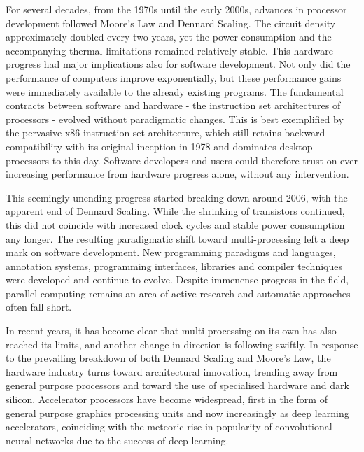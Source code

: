     For several decades, from the 1970s until the early 2000s, advances in
    processor development followed Moore's Law and Dennard Scaling.
    The circuit density approximately doubled every two years, yet the power
    consumption and the accompanying thermal limitations remained relatively
    stable.
    This hardware progress had major implications also for software
    development.
    Not only did the performance of computers improve exponentially, but these
    performance gains were immediately available to the already existing
    programs.
    The fundamental contracts between software and hardware - the
    instruction set architectures of processors - evolved without paradigmatic
    changes.
    This is best exemplified by the pervasive x86 instruction set architecture,
    which still retains backward compatibility with its original inception in
    1978 and dominates desktop processors to this day.
    Software developers and users could therefore trust on ever increasing
    performance from hardware progress alone, without any intervention.

    This seemingly unending progress started breaking down around 2006,
    with the apparent end of Dennard Scaling.
    While the shrinking of transistors continued, this did not coincide with
    increased clock cycles and stable power consumption any longer.
    The resulting paradigmatic shift toward multi-processing left a deep mark on
    software development.
    New programming paradigms and languages, annotation systems, programming
    interfaces, libraries and compiler techniques were developed and continue to
    evolve.
    Despite immenense progress in the field, parallel computing remains an area
    of active research and automatic approaches often fall short.

    In recent years, it has become clear that multi-processing on its own has
    also reached its limits, and another change in direction is following
    swiftly.
    In response to the prevailing breakdown of both Dennard Scaling and Moore's
    Law, the hardware industry turns toward architectural innovation, trending
    away from general purpose processors and toward the use of specialised
    hardware and dark silicon.
    Accelerator processors have become widespread, first in the form of general
    purpose graphics processing units and now increasingly as deep learning
    accelerators, coinciding with the meteoric rise in popularity of
    convolutional neural networks due to the success of deep learning.

